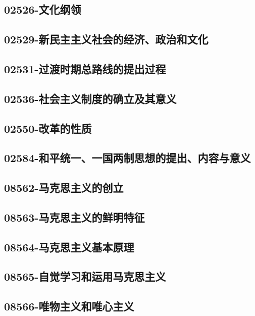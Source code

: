 \subsection{02526-文化纲领}

\subsection{02529-新民主主义社会的经济、政治和文化}

\subsection{02531-过渡时期总路线的提出过程}

\subsection{02536-社会主义制度的确立及其意义}

\subsection{02550-改革的性质}

\subsection{02584-和平统一、一国两制思想的提出、内容与意义}

\subsection{08562-马克思主义的创立}

\subsection{08563-马克思主义的鲜明特征}

\subsection{08564-马克思主义基本原理}

\subsection{08565-自觉学习和运用马克思主义}

\subsection{08566-唯物主义和唯心主义}

